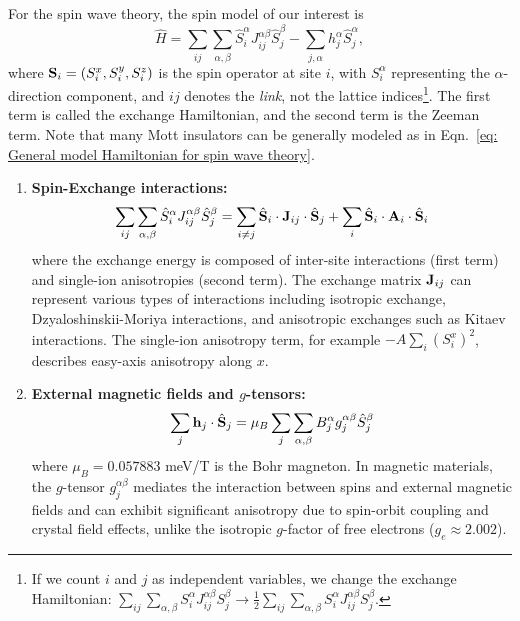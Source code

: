 \documentclass[aps, prx, nofootinbib, superscriptaddress]{revtex4-2}
\begin{document}
For the spin wave theory, the spin model of our interest is 
\begin{equation}\label{eq: General model Hamiltonian for spin wave theory}
    \hat{H} 
    = \sum_{ij} \sum_{\alpha, \beta} \hat{S}^{\alpha}_{i} J_{ij}^{\alpha\beta}  \hat{S}^{\beta}_{j}  
    -  \sum_{j, \alpha} h_{j}^{\alpha} \hat{S}^{\alpha}_{j},
\end{equation}
where ${\bf S}_{i} = (S^{x}_{i}, S^{y}_{i}, S_{i}^{z})$ is the spin operator at site $i$, with $S^\alpha_i$ representing the $\alpha$-direction component, and $ij$ denotes the \emph{link}, not the lattice indices\footnote{
    If we count $i$ and $j$ as independent variables, we change the exchange Hamiltonian: $\sum_{ij} \sum_{\alpha, \beta} S^{\alpha}_{i} J_{ij}^{\alpha\beta}  S^{\beta}_{j} \rightarrow \frac{1}{2} \sum_{ij} \sum_{\alpha, \beta} S^{\alpha}_{i} J_{ij}^{\alpha\beta} S^{\beta}_{j}$.
}.
The first term is called the exchange Hamiltonian, and the second term is the Zeeman term. 
Note that many Mott insulators can be generally modeled as in Eqn.~\eqref{eq: General model Hamiltonian for spin wave theory}.
\begin{enumerate}[label=(\roman*)]
    \item {\bf Spin-Exchange interactions:} 
    \begin{equation}
        \sum_{ij} \sum_{\alpha, \beta} \hat{S}^{\alpha}_{i} J_{ij}^{\alpha\beta}  \hat{S}^{\beta}_{j}  
        = \sum_{i \neq j} \hat{\bf S}_{i} \cdot {\bf J}_{ij} \cdot \hat{\bf S}_{j} + \sum_{i} \hat{\bf S}_{i} \cdot {\bf A}_{i} \cdot \hat{\bf S}_{i}
    \end{equation}
    where the exchange energy is composed of inter-site interactions (first term) and single-ion anisotropies (second term). The exchange matrix ${\bf J}_{ij}$ can represent various types of interactions including isotropic exchange, Dzyaloshinskii-Moriya interactions, and anisotropic exchanges such as Kitaev interactions. The single-ion anisotropy term, for example $- A \sum_{i} (S^{x}_{i})^{2}$, describes easy-axis anisotropy along $x$.
    
    \item {\bf External magnetic fields and $g$-tensors:}
    \begin{equation}
        \sum_{j} {\bf h}_{j} \cdot \hat{\bf S}_{j} = \mu_B \sum_{j} \sum_{\alpha, \beta} B_{j}^{\alpha} g_{j}^{\alpha\beta} \hat{S}^{\beta}_{j}
    \end{equation}
    where $\mu_B = 0.057883$ meV/T is the Bohr magneton. In magnetic materials, the $g$-tensor $g_{j}^{\alpha\beta}$ mediates the interaction between spins and external magnetic fields and can exhibit significant anisotropy due to spin-orbit coupling and crystal field effects, unlike the isotropic $g$-factor of free electrons ($g_e \approx 2.002$).
\end{enumerate}
\end{document}
